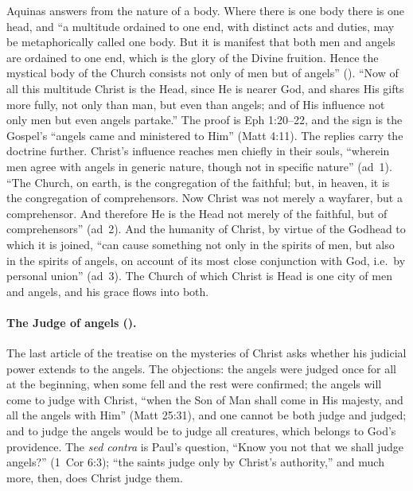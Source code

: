 Aquinas answers from the nature of a body. Where there is one body there is
one head, and ``a multitude ordained to one end, with distinct acts and
duties, may be metaphorically called one body. But it is manifest that both
men and angels are ordained to one end, which is the glory of the Divine
fruition. Hence the mystical body of the Church consists not only of men
but of angels'' (). ``Now of all this multitude Christ is the
Head, since He is nearer God, and shares His gifts more fully, not only than
man, but even than angels; and of His influence not only men but even
angels partake.'' The proof is Eph 1:20--22, and the sign is the Gospel's
``angels came and ministered to Him'' (Matt 4:11). The replies carry the
doctrine further. Christ's influence reaches men chiefly in their souls,
``wherein men agree with angels in generic nature, though not in specific
nature'' (ad~1). ``The Church, on earth, is the congregation of the
faithful; but, in heaven, it is the congregation of comprehensors. Now
Christ was not merely a wayfarer, but a comprehensor. And therefore He is
the Head not merely of the faithful, but of comprehensors'' (ad~2). And the
humanity of Christ, by virtue of the Godhead to which it is joined, ``can
cause something not only in the spirits of men, but also in the spirits of
angels, on account of its most close conjunction with God, i.e.\ by
personal union'' (ad~3). The Church of which Christ is Head is one city of
men and angels, and his grace flows into both.

\paragraph{The Judge of angels ().} The last article of
the treatise on the mysteries of Christ asks whether his judicial power
extends to the angels. The objections: the angels were judged once for all
at the beginning, when some fell and the rest were confirmed; the angels
will come to judge with Christ, ``when the Son of Man shall come in His
majesty, and all the angels with Him'' (Matt 25:31), and one cannot be both
judge and judged; and to judge the angels would be to judge all creatures,
which belongs to God's providence. The \emph{sed contra} is Paul's question,
``Know you not that we shall judge angels?'' (1~Cor 6:3); ``the saints
judge only by Christ's authority,'' and much more, then, does Christ judge
them.

